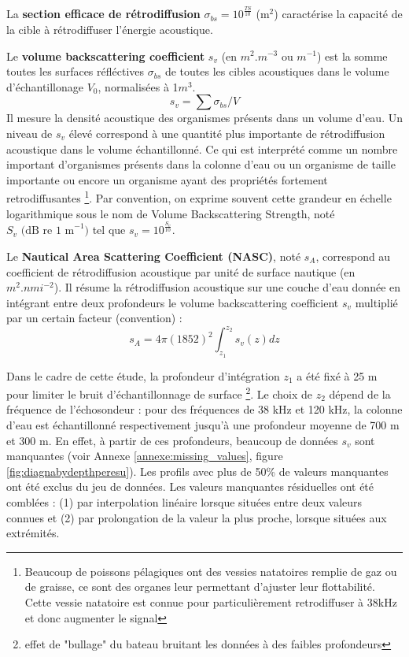  La \textbf{section efficace de rétrodiffusion} \(\sigma_{bs} = 10^{\frac{TS}{10}}\)  (\(\mathrm{m^2}\)) caractérise la capacité de la cible à rétrodiffuser l'énergie acoustique. 
 
 \vspace{0.5cm}
 
 Le \textbf{volume backscattering coefficient} $s_v$ (en $m^{2}.m^{-3}$ ou $m^{-1}$) est la somme  toutes les surfaces réfléctives $\sigma_{bs}$ de toutes les cibles acoustiques dans le volume d'échantillonage $V_0$, normalisées à 1$m^{3}$.  
 \begin{equation}
 	s_v = \sum \sigma_{bs}/V
 \end{equation}
 Il mesure la densité acoustique des organismes présents dans un volume d'eau. Un niveau de $s_v$ élevé correspond à une quantité plus importante de rétrodiffusion acoustique dans le volume échantillonné. Ce qui est interprété comme un nombre important d'organismes présents dans la colonne d'eau ou un organisme de taille importante ou encore un organisme ayant des propriétés fortement retrodiffusantes \footnote{Beaucoup de poissons pélagiques ont des vessies natatoires remplie de gaz ou de graisse, ce sont des organes leur permettant d'ajuster leur flottabilité. Cette vessie natatoire est connue pour particulièrement retrodiffuser à 38kHz et donc augmenter le signal}. Par convention, on exprime souvent cette grandeur en échelle logarithmique sous le nom de Volume Backscattering Strength, noté $S_v \text{ (dB re 1 m}^{-1})$ tel que $s_v = 10^{\frac {S_v} {10}}$.
 
 \vspace{0.5cm}
 
 Le \textbf{Nautical Area Scattering Coefficient (NASC)}, noté $s_A$, correspond au coefficient de rétrodiffusion acoustique par unité de surface nautique (en $m^{2}.nmi^{-2}$). Il résume la rétrodiffusion acoustique sur une couche d'eau donnée en intégrant entre deux profondeurs le volume backscattering coefficient $s_v$ multiplié par un certain facteur (convention) :
 \begin{equation}
 	s_A = 4 \pi (1852)^{2} \int_{z_{1}}^{z_{2}} s_v(z) dz
 \end{equation}
 
 Dans le cadre de cette étude, la profondeur d'intégration $z_1$ a été fixé à 25 m pour limiter le bruit d’échantillonnage de surface \footnote{effet de "bullage" du bateau bruitant les données à des faibles profondeurs}. Le choix de $z_2$ dépend de la fréquence de l'échosondeur : pour des fréquences de 38 kHz et 120 kHz, la colonne d'eau est échantillonné respectivement jusqu'à une profondeur moyenne de 700 m et 300 m. En effet, à partir de ces profondeurs, beaucoup de données $s_v$  sont manquantes (voir Annexe \ref{annexe:missing_values}, figure \ref{fig:diagnabydepthperesu}). Les profils avec plus de 50\% de valeurs manquantes ont été exclus du jeu de données. Les valeurs manquantes résiduelles ont été comblées : (1) par interpolation linéaire lorsque situées entre deux valeurs connues et (2) par prolongation de la valeur la plus proche, lorsque situées aux extrémités. 
 
